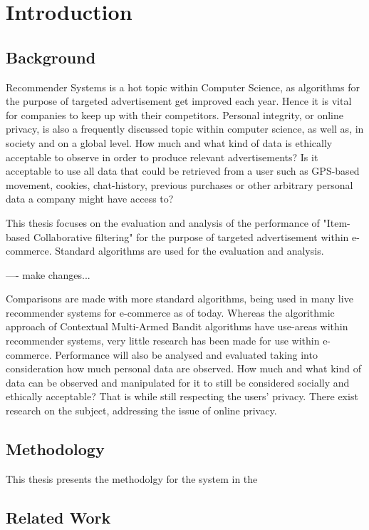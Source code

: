 \chapter{Introduction}

\section{Background}

Recommender Systems is a hot topic within Computer Science, as algorithms for the purpose of targeted advertisement get improved each year. Hence it is vital for companies to keep up with their competitors. Personal integrity, or online privacy, is also a frequently discussed topic within computer science, as well as, in society and on a global level. How much and what kind of data is ethically acceptable to observe in order to produce relevant advertisements? Is it acceptable to use all data that could be retrieved from a user such as GPS-based movement, cookies, chat-history, previous purchases or other arbitrary personal data a company might have access to?

This thesis focuses on the evaluation and analysis of the performance of "Item-based Collaborative filtering" for the purpose of targeted advertisement within e-commerce. Standard algorithms are used for the evaluation and analysis.

---- make changes...

Comparisons are made with more standard algorithms, being used in many live recommender systems for e-commerce as of today. Whereas the algorithmic approach of Contextual Multi-Armed Bandit algorithms have use-areas within recommender systems, very little research has been made for use within e-commerce. Performance will also be analysed and evaluated taking into consideration how much personal data are observed. How much and what kind of data can be observed and manipulated for it to still be considered socially and ethically acceptable? That is while still respecting the users’ privacy. There exist research on the subject, addressing the issue of online privacy. \cite{Park2012}


\section{Methodology}
This thesis presents the methodolgy for the system in the 


\section{Related Work}

